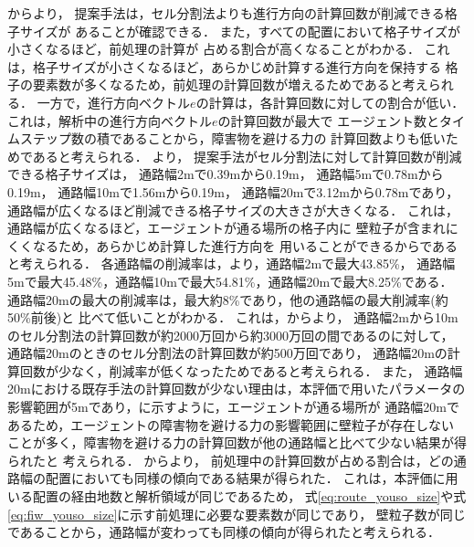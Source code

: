 からより，
提案手法は，セル分割法よりも進行方向の計算回数が削減できる格子サイズが
あることが確認できる．
また，すべての配置において格子サイズが小さくなるほど，前処理の計算が
占める割合が高くなることがわかる．
これは，格子サイズが小さくなるほど，あらかじめ計算する進行方向を保持する
格子の要素数が多くなるため，前処理の計算回数が増えるためであると考えられる．
一方で，進行方向ベクトル$e$の計算は，各計算回数に対しての割合が低い．
これは，解析中の進行方向ベクトル$e$の計算回数が最大で
エージェント数とタイムステップ数の積であることから，障害物を避ける力の
計算回数よりも低いためであると考えられる．
%
より，
提案手法がセル分割法に対して計算回数が削減できる格子サイズは，
通路幅2mで0.39mから0.19m，
通路幅5mで0.78mから0.19m，
通路幅10mで1.56mから0.19m，
通路幅20mで3.12mから0.78mであり，
通路幅が広くなるほど削減できる格子サイズの大きさが大きくなる．
これは，通路幅が広くなるほど，エージェントが通る場所の格子内に
壁粒子が含まれにくくなるため，あらかじめ計算した進行方向を
用いることができるからであると考えられる．
%
各通路幅の削減率は，より，通路幅2mで最大43.85\%，
通路幅5mで最大45.48\%，通路幅10mで最大54.81\%，通路幅20mで最大8.25\%である．
通路幅20mの最大の削減率は，最大約8\%であり，他の通路幅の最大削減率(約50\%前後)と
比べて低いことがわかる．
これは，からより，
通路幅2mから10mのセル分割法の計算回数が約2000万回から約3000万回の間であるのに対して，
通路幅20mのときのセル分割法の計算回数が約500万回であり，
通路幅20mの計算回数が少なく，削減率が低くなったためであると考えられる．
また，
通路幅20mにおける既存手法の計算回数が少ない理由は，本評価で用いたパラメータの
影響範囲が5mであり，に示すように，エージェントが通る場所が
通路幅20mであるため，エージェントの障害物を避ける力の影響範囲に壁粒子が存在しない
ことが多く，障害物を避ける力の計算回数が他の通路幅と比べて少ない結果が得られたと
考えられる．
%
からより，
前処理中の計算回数が占める割合は，どの通路幅の配置においても同様の傾向である結果が得られた．
これは，本評価に用いる配置の経由地数と解析領域が同じであるため，
式\eqref{eq:route_youso_size}や式\eqref{eq:fiw_youso_size}に示す前処理に必要な要素数が同じであり，
壁粒子数が同じであることから，通路幅が変わっても同様の傾向が得られたと考えられる．


